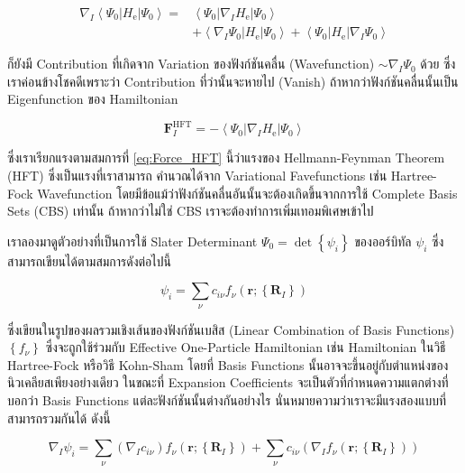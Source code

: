 \begin{align}
  \nabla_I\left\langle\Psi_0\left| H_{\mathrm{e}}\right| \Psi_0\right\rangle
  = & \left\langle\Psi_0\left|\nabla_I  H_{\mathrm{e}}\right| \Psi_0\right\rangle  \\
    & +\left\langle\nabla_I \Psi_0\left| H_{\mathrm{e}}\right| \Psi_0\right\rangle
  + \left\langle\Psi_0\left| H_{\mathrm{e}}\right| \nabla_I \Psi_0\right\rangle
\end{align}

\noindent ก็ยังมี Contribution ที่เกิดจาก Variation ของฟังก์ชันคลื่น (Wavefunction) $\sim \nabla_I \Psi_0$ ด้วย
ซึ่งเราค่อนข้างโชคดีเพราะว่า Contribution ที่ว่านั้นจะหายไป (Vanish) ถ้าหากว่าฟังก์ชันคลื่นนั้นเป็น Eigenfunction ของ Hamiltonian

\begin{equation}
  \label{eq:Force_HFT}
  \mathbf{F}_I^{\mathrm{HFT}}
  =
  -\left\langle\Psi_0\left|\nabla_I  H_{\mathrm{e}}\right| \Psi_0\right\rangle
\end{equation}

\noindent ซึ่งเราเรียกแรงตามสมการที่ \eqref{eq:Force_HFT} นี้ว่าแรงของ Hellmann-Feynman Theorem (HFT) ซึ่งเป็นแรงที่เราสามารถ%
คำนวณได้จาก Variational Favefunctions เช่น Hartree-Fock Wavefunction โดยมีข้อแม้ว่าฟังก์ชันคลื่นอันนั้นจะต้องเกิดขึ้นจากการใช้
Complete Basis Sets (CBS) เท่านั้น ถ้าหากว่าไม่ใช่ CBS เราจะต้องทำการเพิ่มเทอมพิเศษเข้าไป

เราลองมาดูตัวอย่างที่เป็นการใช้ Slater Determinant $\Psi_0=\operatorname{det}\left\{\psi_i\right\}$ ของออร์บิทัล $\psi_i$
ซึ่งสามารถเขียนได้ตามสมการดังต่อไปนี้

\begin{equation}
  \label{eq:One_Particle_Orbitals}
  \psi_i
  =
  \sum_\nu c_{i \nu} f_\nu\left(\mathbf{r} ;\left\{\mathbf{R}_I\right\}\right)
\end{equation}

\noindent ซึ่งเขียนในรูปของผลรวมเชิงเส้นของฟังก์ชันเบสิส (Linear Combination of Basis Functions) $\left\{f_\nu\right\}$
ซึ่งจะถูกใช้ร่วมกับ Effective One-Particle Hamiltonian เช่น Hamiltonian ในวิธี Hartree-Fock หรือวิธี Kohn-Sham โดยที่ Basis
Functions นั้นอาจจะขึ้นอยู่กับตำแหน่งของนิวเคลียสเพียงอย่างเดียว ในขณะที่ Expansion Coefficients จะเป็นตัวที่กำหนดความแตกต่างที่บอกว่า
Basis Functions แต่ละฟังก์ชันนั้นต่างกันอย่างไร นั่นหมายความว่าเราจะมีแรงสองแบบที่สามารถรวมกันได้ ดังนี้

\begin{equation}
  \nabla_I \psi_i
  =
  \sum_\nu\left(\nabla_I c_{i \nu}\right) f_\nu\left(\mathbf{r} ;\left\{\mathbf{R}_I\right\}\right)
  + \sum_\nu c_{i \nu}\left(\nabla_I f_\nu\left(\mathbf{r} ;\left\{\mathbf{R}_I\right\}\right)\right)
\end{equation}

